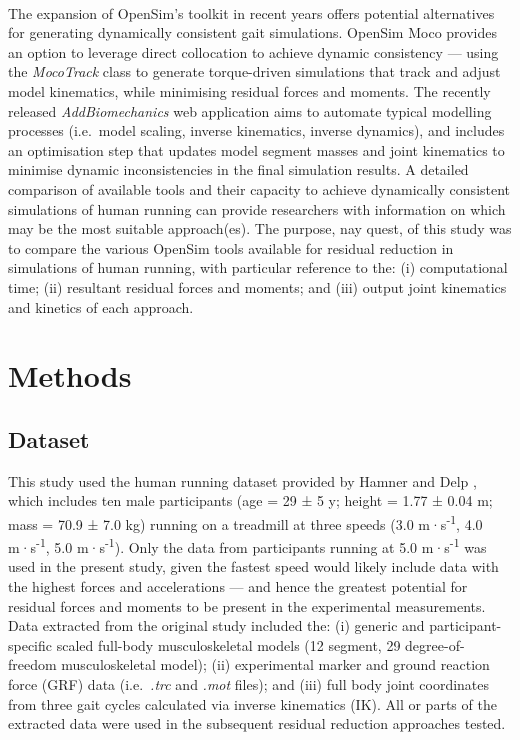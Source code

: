\documentclass[]{elsarticle} %
\begin{document}
~

The expansion of OpenSim's toolkit in recent years offers potential
alternatives for generating dynamically consistent gait simulations.
OpenSim Moco \citep{Dembia2020} provides an option to leverage direct
collocation to achieve dynamic consistency --- using the
\emph{MocoTrack} class to generate torque-driven simulations that track
and adjust model kinematics, while minimising residual forces and
moments. The recently released \emph{AddBiomechanics} web application
\citep{Werling2023} aims to automate typical modelling processes
(i.e.~model scaling, inverse kinematics, inverse dynamics), and includes
an optimisation step that updates model segment masses and joint
kinematics to minimise dynamic inconsistencies in the final simulation
results. A detailed comparison of available tools and their capacity to
achieve dynamically consistent simulations of human running can provide
researchers with information on which may be the most suitable
approach(es). The purpose, nay quest, of this study was to compare the
various OpenSim tools available for residual reduction in simulations of
human running, with particular reference to the: (i) computational time;
(ii) resultant residual forces and moments; and (iii) output joint
kinematics and kinetics of each approach.

\hypertarget{methods}{%
\section{Methods}\label{methods}}

\hypertarget{dataset}{%
\subsection{Dataset}\label{dataset}}

This study used the human running dataset provided by Hamner and Delp
\citep{Hamner2013}, which includes ten male participants (age = 29 ± 5
y; height = 1.77 ± 0.04 m; mass = 70.9 ± 7.0 kg) running on a treadmill
at three speeds (3.0 m·s\textsuperscript{-1}, 4.0
m·s\textsuperscript{-1}, 5.0 m·s\textsuperscript{-1}). Only the data
from participants running at 5.0 m·s\textsuperscript{-1} was used in the
present study, given the fastest speed would likely include data with
the highest forces and accelerations --- and hence the greatest
potential for residual forces and moments to be present in the
experimental measurements. Data extracted from the original study
\citep{Hamner2013} included the: (i) generic and participant-specific
scaled full-body musculoskeletal models (12 segment, 29
degree-of-freedom musculoskeletal model); (ii) experimental marker and
ground reaction force (GRF) data (i.e.~\emph{.trc} and \emph{.mot}
files); and (iii) full body joint coordinates from three gait cycles
calculated via inverse kinematics (IK). All or parts of the extracted
data were used in the subsequent residual reduction approaches tested.
\end{document}
